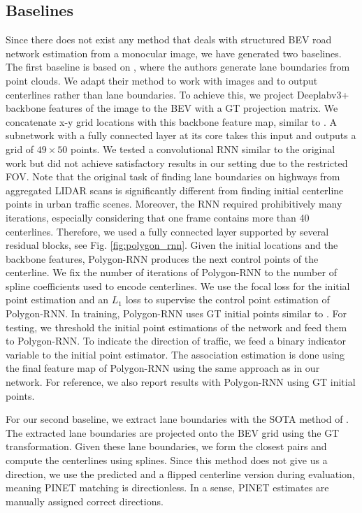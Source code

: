 \documentclass[10pt,twocolumn,letterpaper]{article}
\begin{document}
\subsection{Baselines}
Since there does not exist any method that deals with structured BEV road network estimation from a monocular image, we have generated two baselines. The first baseline is based on \cite{DBLP:conf/cvpr/HomayounfarMLU18}, where the authors generate lane boundaries from point clouds. We adapt their method to work with images and to output centerlines rather than lane boundaries. To achieve this, we project Deeplabv3+ \cite{DBLP:conf/eccv/ChenZPSA18} backbone features of the image to the BEV with a GT projection matrix. We concatenate x-y grid locations with this backbone feature map, similar to \cite{DBLP:conf/nips/LiuLMSFSY18}. A subnetwork with a fully connected layer at its core takes this input and outputs a grid of $49\times50$ points. 
We tested a convolutional RNN similar to the original work but did not achieve satisfactory results in our setting due to the restricted FOV. Note that the original task of finding lane boundaries on highways from aggregated LIDAR scans is significantly different from finding initial centerline points in urban traffic scenes. Moreover, the RNN required prohibitively many iterations, especially considering that one frame contains more than 40 centerlines.  
Therefore, we used a fully connected layer supported by several residual blocks, see Fig. \ref{fig:polygon_rnn}. Given the initial locations and the backbone features, Polygon-RNN \cite{DBLP:conf/cvpr/AcunaLKF18} produces the next control points of the centerline. We fix the number of iterations of Polygon-RNN to the number of spline coefficients used to encode centerlines. We use the focal loss \cite{DBLP:journals/pami/LinGGHD20} for the initial point estimation and an $L_1$ loss to supervise the control point estimation of Polygon-RNN. In training, Polygon-RNN uses GT initial points similar to \cite{DBLP:conf/cvpr/HomayounfarMLU18}. For testing, we threshold the initial point estimations of the network and feed them to Polygon-RNN. To indicate the direction of traffic, we feed a binary indicator variable to the initial point estimator. The association estimation is done using the final feature map of Polygon-RNN using the same approach as in our network. For reference, we also report results with Polygon-RNN using GT initial points.




For our second baseline, we extract lane boundaries with the SOTA method of \cite{DBLP:journals/corr/abs-2002-06604}. The extracted lane boundaries are projected onto the BEV grid using the GT transformation. Given these lane boundaries, we form the closest pairs and compute the centerlines using splines. Since this method does not give us a direction, we use the predicted and a flipped centerline version during evaluation, meaning PINET matching is directionless. In a sense, PINET estimates are manually assigned correct directions.
\end{document}
